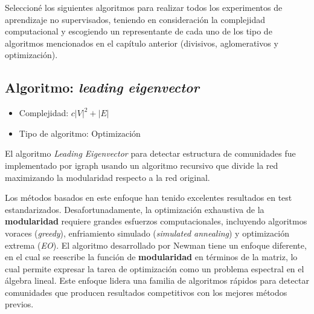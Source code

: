 Seleccioné los siguientes algoritmos para realizar todos los experimentos de aprendizaje no supervisados, teniendo en consideración la complejidad computacional y escogiendo un representante de cada uno de los tipo de algoritmos mencionados en el capítulo anterior (divisivos, aglomerativos y optimización).

\subsection{Algoritmo: \textit{leading eigenvector}}\cite{Newman2006FindingMatrices.} 
\begin{itemize}
\item Complejidad: $c|V|^2 + |E|$
\item Tipo de algoritmo: Optimización
\end{itemize} 
El algoritmo \textit{Leading Eigenvector} para detectar estructura de comunidades fue implementado por igraph usando un algoritmo recursivo que divide la red maximizando la modularidad respecto a la red original. 
 
Los métodos basados en este enfoque han tenido excelentes resultados en test estandarizados. Desafortunadamente, la optimización exhaustiva de la \textbf{modularidad} requiere grandes esfuerzos computacionales, incluyendo algoritmos voraces (\textit{greedy}), enfriamiento simulado (\textit{simulated annealing}) y optimización extrema (\textit{EO}). El algoritmo desarrollado por Newman tiene un enfoque diferente, en el cual se reescribe la función de \textbf{modularidad} en términos de la matriz, lo cual permite expresar la tarea de optimización como un problema espectral en el álgebra lineal. Este enfoque lidera una familia de algoritmos rápidos para detectar comunidades que producen resultados competitivos con los mejores métodos previos.
 

